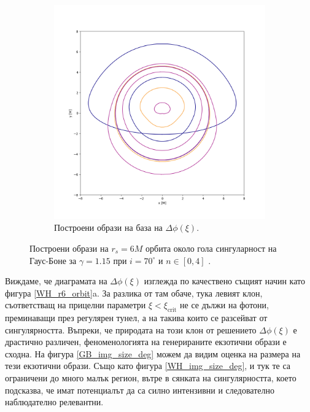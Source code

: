 \begin{figure}[!htb]
\begin{subfigure}{6cm}
	\end{subfigure}\,\,\,
	\begin{subfigure}{6cm}
		\hspace{-0.5cm}
		\includegraphics[scale = 0.3]{GB_70_deg_r6_gamma_1.15.png}
		\caption{Построени образи на база на  $\Delta\phi(\xi)$.} 
	\end{subfigure}
	\caption[Построени образи на $r_s = 6M$ орбита около гола сингулярност на Гаус-Боне за $i = 70^\circ$.]{\small Построени образи на $r_s = 6M$ орбита около гола сингуларност на Гаус-Боне за $\gamma = 1.15$ при $i = 70^\circ$ и $n\in[0,4]$ \cite{Gyulchev2021}.} 
	\label{GB_r6_70_deg_gamma_1.15}
\end{figure}

Виждаме, че диаграмата на $\Delta\phi(\xi)$ изглежда по качествено същият начин като фигура \ref{WH_r6_orbit}a. За разлика от там обаче, тука левият клон, съответстващ на прицелни параметри $\xi < \xi_\text{crit}$ не се дължи на фотони, преминаващи през регулярен тунел, а на такива които се разсейват от сингулярността. Въпреки, че природата на този клон от решението $\Delta\phi(\xi)$ е драстично различен, феноменологията на генерираните екзотични образи е сходна. На фигура \ref{GB_img_size_deg} можем да видим оценка на размера на тези екзотични образи. Също като фигура \ref{WH_img_size_deg}, и тук те са ограничени до много малък регион, вътре в сянката на сингулярността, което подсказва, че имат потенциалът да са силно интензивни и следователно наблюдателно релевантни.

